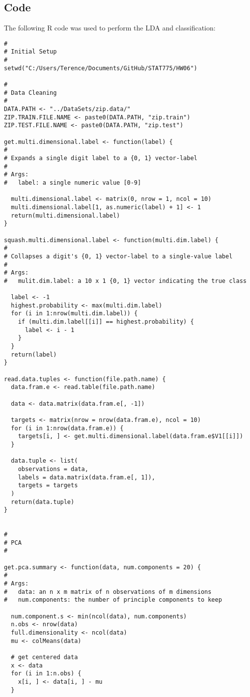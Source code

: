 \documentclass{article}
\begin{document}
\subsection{Code}
The following R code was used to perform the LDA and classification:
\begin{verbatim}
#
# Initial Setup
#
setwd("C:/Users/Terence/Documents/GitHub/STAT775/HW06")

#
# Data Cleaning
#
DATA.PATH <- "../DataSets/zip.data/"
ZIP.TRAIN.FILE.NAME <- paste0(DATA.PATH, "zip.train")
ZIP.TEST.FILE.NAME <- paste0(DATA.PATH, "zip.test")

get.multi.dimensional.label <- function(label) {
#
# Expands a single digit label to a {0, 1} vector-label
#
# Args:
#   label: a single numeric value [0-9]

  multi.dimensional.label <- matrix(0, nrow = 1, ncol = 10)
  multi.dimensional.label[1, as.numeric(label) + 1] <- 1
  return(multi.dimensional.label)
}

squash.multi.dimensional.label <- function(multi.dim.label) {
#
# Collapses a digit's {0, 1} vector-label to a single-value label
#
# Args:
#   mulit.dim.label: a 10 x 1 {0, 1} vector indicating the true class

  label <- -1
  highest.probability <- max(multi.dim.label)
  for (i in 1:nrow(multi.dim.label)) {
    if (multi.dim.label[[i]] == highest.probability) {
      label <- i - 1
    }
  }
  return(label)
}

read.data.tuples <- function(file.path.name) {
  data.fram.e <- read.table(file.path.name)

  data <- data.matrix(data.fram.e[, -1])

  targets <- matrix(nrow = nrow(data.fram.e), ncol = 10)
  for (i in 1:nrow(data.fram.e)) {
    targets[i, ] <- get.multi.dimensional.label(data.fram.e$V1[[i]])
  }

  data.tuple <- list(
    observations = data,
    labels = data.matrix(data.fram.e[, 1]),
    targets = targets
  )
  return(data.tuple)
}


#
# PCA
#

get.pca.summary <- function(data, num.components = 20) {
#
# Args:
#   data: an n x m matrix of n observations of m dimensions
#   num.components: the number of principle components to keep

  num.component.s <- min(ncol(data), num.components)
  n.obs <- nrow(data)
  full.dimensionality <- ncol(data)
  mu <- colMeans(data)

  # get centered data
  x <- data
  for (i in 1:n.obs) {
    x[i, ] <- data[i, ] - mu
  }


\end{verbatim}
\end{document}
